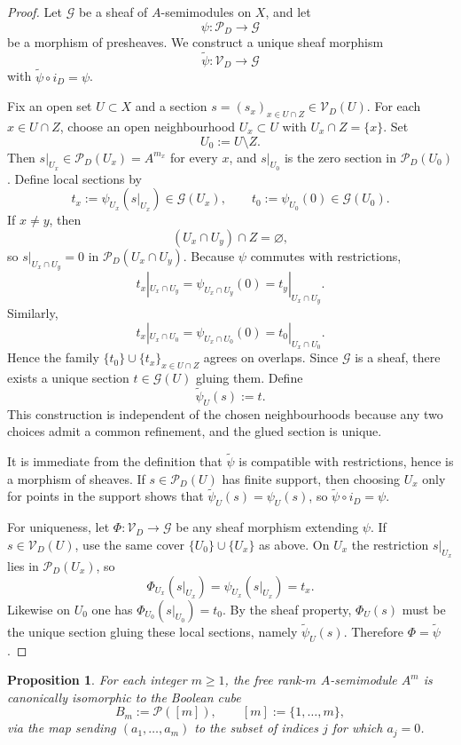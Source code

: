 \documentclass[11pt,a4paper]{article}
\newtheorem{proposition}[theorem]{Proposition}
\theoremstyle{definition}
\theoremstyle{remark}
\newcommand{\cP}{\mathcal P}
\newcommand{\Vd}{\mathcal V_D}
\newcommand{\Pd}{\mathcal P_D}
\begin{document}
\begin{proof}
Let $\mathcal G$ be a sheaf of $A$-semimodules on $X$, and let
\[
\psi:\Pd\longrightarrow \mathcal G
\]
be a morphism of presheaves. We construct a unique sheaf morphism
\[
\widetilde\psi:\Vd\longrightarrow \mathcal G
\]
with $\widetilde\psi\circ i_D=\psi$.

Fix an open set $U\subset X$ and a section $s=(s_x)_{x\in U\cap Z}\in\Vd(U)$. For each $x\in U\cap Z$, choose an open neighbourhood $U_x\subset U$ with $U_x\cap Z=\{x\}$. Set
\[
U_0:=U\setminus Z.
\]
Then $s|_{U_x}\in\Pd(U_x)=A^{m_x}$ for every $x$, and $s|_{U_0}$ is the zero section in $\Pd(U_0)$.
Define local sections by
\[
t_x:=\psi_{U_x}(s|_{U_x})\in \mathcal G(U_x),
\qquad
 t_0:=\psi_{U_0}(0)\in \mathcal G(U_0).
\]
If $x\neq y$, then
\[
(U_x\cap U_y)\cap Z=\varnothing,
\]
so $s|_{U_x\cap U_y}=0$ in $\Pd(U_x\cap U_y)$. Because $\psi$ commutes with restrictions,
\[
t_x|_{U_x\cap U_y}=\psi_{U_x\cap U_y}(0)=t_y|_{U_x\cap U_y}.
\]
Similarly,
\[
t_x|_{U_x\cap U_0}=\psi_{U_x\cap U_0}(0)=t_0|_{U_x\cap U_0}.
\]
Hence the family $\{t_0\}\cup\{t_x\}_{x\in U\cap Z}$ agrees on overlaps. Since $\mathcal G$ is a sheaf, there exists a unique section $t\in\mathcal G(U)$ gluing them. Define
\[
\widetilde\psi_U(s):=t.
\]
This construction is independent of the chosen neighbourhoods because any two choices admit a common refinement, and the glued section is unique.

It is immediate from the definition that $\widetilde\psi$ is compatible with restrictions, hence is a morphism of sheaves. If $s\in\Pd(U)$ has finite support, then choosing $U_x$ only for points in the support shows that $\widetilde\psi_U(s)=\psi_U(s)$, so $\widetilde\psi\circ i_D=\psi$.

For uniqueness, let $\Phi:\Vd\to\mathcal G$ be any sheaf morphism extending $\psi$. If $s\in\Vd(U)$, use the same cover $\{U_0\}\cup\{U_x\}$ as above. On $U_x$ the restriction $s|_{U_x}$ lies in $\Pd(U_x)$, so
\[
\Phi_{U_x}(s|_{U_x})=\psi_{U_x}(s|_{U_x})=t_x.
\]
Likewise on $U_0$ one has $\Phi_{U_0}(s|_{U_0})=t_0$. By the sheaf property, $\Phi_U(s)$ must be the unique section gluing these local sections, namely $\widetilde\psi_U(s)$. Therefore $\Phi=\widetilde\psi$.
\end{proof}

\begin{proposition}\label{prop:boolean-cube}
For each integer $m\geq 1$, the free rank-$m$ $A$-semimodule $A^m$ is canonically isomorphic to the Boolean cube
\[
B_m:=\cP([m]),\qquad [m]:=\{1,\dots,m\},
\]
via the map sending $(a_1,\dots,a_m)$ to the subset of indices $j$ for which $a_j=0$.
\end{proposition}
\end{document}
